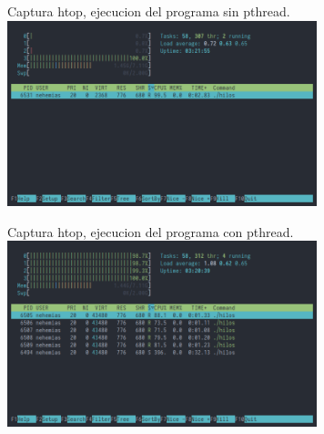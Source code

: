 \documentclass[a4paper,12pt]{article}
\begin{document}
\begin{enumerate}
  Captura htop, ejecucion del programa sin pthread.\newline
  \includegraphics[width=9cm]{sin_pthread.png}

  Captura htop, ejecucion del programa con pthread.\newline
  \includegraphics[width=9cm]{con_pthread.png}
\end{enumerate}
\end{document}

